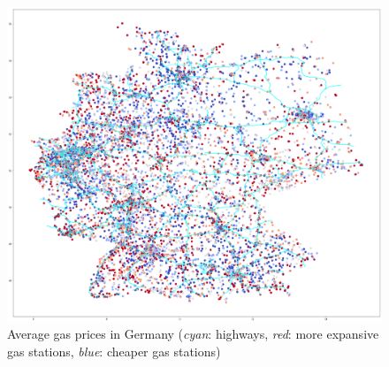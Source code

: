\begin{figure}[H]
  \centering
    \includegraphics[width=1\textwidth,height=1.05\textwidth,
    ]{img/avg_price_in_all_time.png}
     \caption{Average gas prices in Germany (\textit{cyan}: highways, \textit{red}: more expansive gas stations, \textit{blue}: cheaper gas stations)}
     \label{fig:all-germany-avg}
\end{figure}